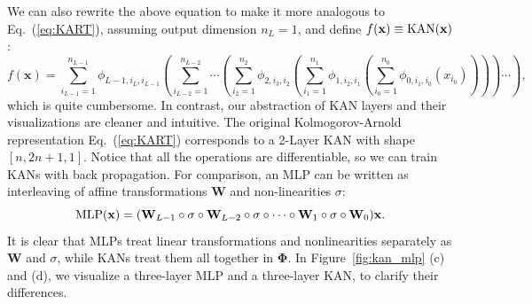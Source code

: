 \documentclass{article}
\numberwithin{equation}{section}
\numberwithin{figure}{section}
\newcommand{\mat}[1]{\mathbf{#1}}
\begin{document}
We can also rewrite the above equation to make it more analogous to Eq.~(\ref{eq:KART}), assuming output dimension $n_{L}=1$, and define $f(\mat{x})\equiv {\rm KAN}(\mat{x})$:
\begin{equation}
    f(\mat{x})=\sum_{i_{L-1}=1}^{n_{L-1}}\phi_{L-1,i_{L},i_{L-1}}\left(\sum_{i_{L-2}=1}^{n_{L-2}}\cdots\left(\sum_{i_2=1}^{n_2}\phi_{2,i_3,i_2}\left(\sum_{i_1=1}^{n_1}\phi_{1,i_2,i_1}\left(\sum_{i_0=1}^{n_0}\phi_{0,i_1,i_0}(x_{i_0})\right)\right)\right)\cdots\right),
\end{equation}
which is quite cumbersome. In contrast, our abstraction of KAN layers and their visualizations are cleaner and intuitive. The original Kolmogorov-Arnold representation Eq.~(\ref{eq:KART}) corresponds to a 2-Layer KAN with shape $[n,2n+1,1]$. Notice that all the operations are differentiable, so we can train KANs with back propagation. For comparison, an MLP can be written as interleaving of affine transformations $\mat{W}$ and non-linearities $\sigma$:
\begin{equation}
    {\rm MLP}(\mat{x}) = (\mat{W}_{L-1}\circ\sigma\circ \mat{W}_{L-2}\circ\sigma\circ\cdots\circ\mat{W}_1\circ\sigma\circ\mat{W}_0)\mat{x}.
\end{equation}
It is clear that MLPs treat linear transformations and nonlinearities separately as $\mat{W}$ and $\sigma$, while KANs treat them all together in $\mat{\Phi}$. In Figure~\ref{fig:kan_mlp} (c) and (d), we visualize a three-layer MLP and a three-layer KAN, to clarify their differences.%
\end{document}

